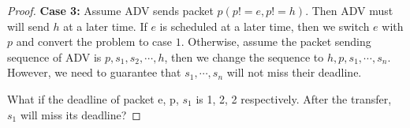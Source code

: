 \documentclass[10 pt,final]{article}
\newcommand{\question}[1]{{\color{blue} #1}}
\begin{document}
\begin{proof}
\textbf{Case 3:} Assume ADV sends packet $p (p!=e, p!=h)$. Then ADV must will send $h$ at a later time. If $e$ is scheduled at a later time, then we switch $e$ with $p$ and convert the problem to case $1$. Otherwise, assume the packet sending sequence of ADV is $p,s_1,s_2,\cdots,h$, then we change the sequence to $h,p,s_1,\cdots,s_n$. However, we need to guarantee that $s_1, \cdots, s_n$ will not miss their deadline. 

\question{What if the deadline of packet e, p, $s_1$ is 1, 2, 2 respectively. After the transfer, $s_1$ will miss its deadline?} 
\end{proof}
















\end{document}
